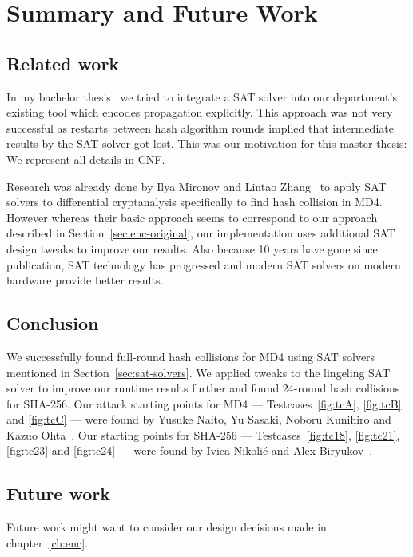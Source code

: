 \renewcommand*\chappic{}
\renewcommand*\chapquote{}
\chapter{Summary and Future Work}
\label{ch:summary}
%
\section{Related work}
\label{sec:results-related}
%
In my bachelor thesis~\cite{bach} we tried to integrate a SAT solver into
our department's existing tool which encodes propagation explicitly. This approach
was not very successful as restarts between hash algorithm rounds implied that
intermediate results by the SAT solver got lost. This was our motivation
for this master thesis: We represent all details in CNF.

Research was already done by Ilya Mironov and Lintao Zhang~\cite{mironov2006applications}
to apply SAT solvers to differential cryptanalysis specifically to find hash collision
in MD4. However whereas their basic approach seems to correspond to our approach described
in Section~\ref{sec:enc-original}, our implementation uses additional SAT design tweaks
to improve our results. Also because 10 years have gone since publication, SAT technology
has progressed and modern SAT solvers on modern hardware provide better results.

\section{Conclusion}
\label{sec:conclusion}
%
We successfully found full-round hash collisions for MD4
using SAT solvers mentioned in Section~\ref{sec:sat-solvers}.
We applied tweaks to the lingeling SAT solver to improve our
runtime results further and found 24-round hash collisions
for SHA-256. Our attack starting points for MD4 ---
Testcases~\ref{fig:tcA}, \ref{fig:tcB} and \ref{fig:tcC} ---
were found by Yusuke Naito, Yu Sasaki, Noboru Kunihiro and
Kazuo Ohta~\cite{sasaki2007new}. Our starting points for SHA-256
--- Testcases~\ref{fig:tc18}, \ref{fig:tc21}, \ref{fig:tc23}
and \ref{fig:tc24} --- were found by Ivica Nikoli{\'c} and
Alex Biryukov~\cite{nikolic2008collisions}.

\section{Future work}
\label{sec:future}
%
Future work might want to consider our design decisions made in
chapter~\ref{ch:enc}.

